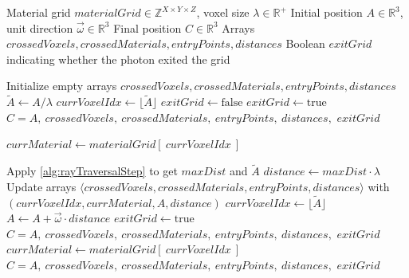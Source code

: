 \begin{algorithm}[H]
    \caption{Ray Traversal: Main Algorithm}
    \label{alg:rayTraversalMain}
    \begin{algorithmic}[1]
        \Require Material grid $materialGrid \in \mathbb{Z}^{X \times Y \times
        Z}$, voxel size $\lambda \in \mathbb{R}^+$
        \Require Initial position $A \in \mathbb{R}^3$, unit direction $\vec{\omega} \in
        \mathbb{R}^3$
        \Ensure Final position $C \in \mathbb{R}^3$
        \Ensure Arrays $crossedVoxels, crossedMaterials, entryPoints, distances$
        \Ensure Boolean $exitGrid$ indicating whether the photon exited the grid

        \State Initialize empty arrays $crossedVoxels, crossedMaterials,
        entryPoints, distances$ 
        \State $\tilde{A} \gets A / \lambda$ 
        \State $currVoxelIdx \gets \lfloor \tilde{A} \rfloor$
        \State $exitGrid \gets \text{false}$
         
            \State $exitGrid \gets \text{true}$
            \State \Return $C = A,\ crossedVoxels,\ crossedMaterials,\ entryPoints,\ distances,$ 
            \Statex {}$exitGrid$
        \EndIf
        
        \State $currMaterial \gets materialGrid[\ currVoxelIdx\ ]$

            \State Apply \autoref{alg:rayTraversalStep} to get $maxDist$ and $\tilde{A}$
            \State $distance \gets maxDist \cdot \lambda$ 
            \State Update arrays $\langle crossedVoxels, crossedMaterials, entryPoints, distances \rangle$ with 
            \Statex \hspace*{\algorithmicindent} $(currVoxelIdx, currMaterial, A, distance)$
            \State $currVoxelIdx \gets\lfloor \tilde{A} \rfloor$
            \State $A \gets A + \vec{\omega} \cdot distance$ 
                \State $exitGrid \gets \text{true}$
                \State \Return $C = A,\ crossedVoxels,\ crossedMaterials,\ entryPoints,\ distances,$ 
                \Statex {}$exitGrid$
            \EndIf
            \State $currMaterial \gets materialGrid[\ currVoxelIdx\ ]$
        \EndWhile
        \State \Return $C = A,\ crossedVoxels,\ crossedMaterials,\ entryPoints,\ distances,$ 
        \Statex {}$exitGrid$
    \end{algorithmic}
\end{algorithm}


